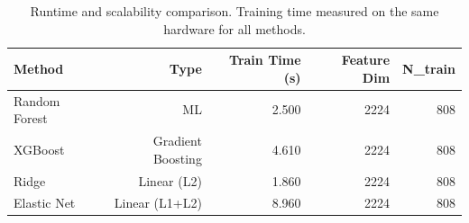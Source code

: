 \begin{table}[htbp]
\centering
\caption{Runtime and scalability comparison. Training time measured on the same hardware for all methods.}
\label{tab:s5_runtime}
\small
\begin{tabular}{lrrrr}
\toprule
\textbf{Method} & \textbf{Type} & \textbf{Train Time (s)} & \textbf{Feature Dim} & \textbf{N_train} \\
\midrule
Random Forest & ML & 2.500 & 2224 & 808 \\
XGBoost & Gradient Boosting & 4.610 & 2224 & 808 \\
Ridge & Linear (L2) & 1.860 & 2224 & 808 \\
Elastic Net & Linear (L1+L2) & 8.960 & 2224 & 808 \\
\bottomrule
\end{tabular}
\end{table}